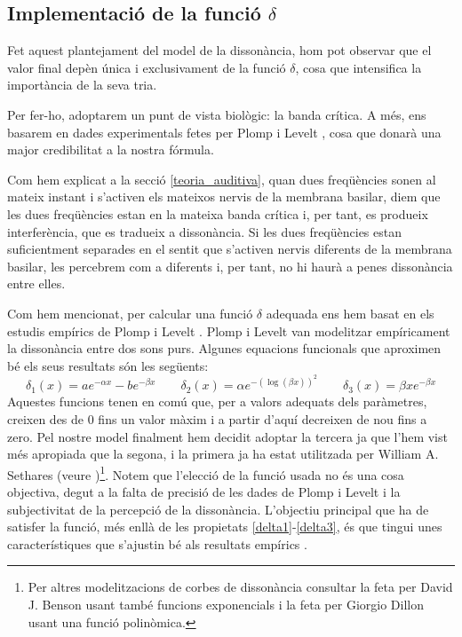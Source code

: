 \documentclass{article}
\theoremstyle{math}
\theoremstyle{TheoremNum}
\newcommand{\0}{\ensuremath{\vb{0}}}
\begin{document}
\subsection{Implementació de la funció \texorpdfstring{$\delta$}{delta}} 
Fet aquest plantejament del model de la dissonància, hom pot observar que el valor final depèn única i exclusivament de la funció $\delta$, cosa que intensifica la importància de la seva tria.\par
Per fer-ho, adoptarem un punt de vista biològic: la banda crítica. A més, ens basarem en dades experimentals fetes per Plomp i Levelt \cite{plomp}, cosa que donarà una major credibilitat a la nostra fórmula.\par Com hem explicat a la secció \ref{teoria_auditiva}, quan dues freqüències sonen al mateix instant i s'activen els mateixos nervis de la membrana basilar, diem que les dues freqüències estan en la mateixa banda crítica i, per tant, es produeix interferència, que es tradueix a dissonància. Si les dues freqüències estan suficientment separades en el sentit que s'activen nervis diferents de la membrana basilar, les percebrem com a diferents i, per tant, no hi haurà a penes dissonància entre elles.\par 
Com hem mencionat, per calcular una funció $\delta$ adequada ens hem basat en els estudis empírics de Plomp i Levelt \cite{plomp}. Plomp i Levelt van modelitzar empíricament la dissonància entre dos sons purs. Algunes equacions funcionals que aproximen bé els seus resultats són les següents: $$\delta_1(x)=ae^{-\alpha x}-be^{-\beta x}\qquad\delta_2(x)=\alpha e^{-\left(\log(\beta x)\right)^2}\qquad\delta_3(x)=\beta xe^{-\beta x}$$
Aquestes funcions tenen en comú que, per a valors adequats dels paràmetres, creixen des de 0 fins un valor màxim i a partir d'aquí decreixen de nou fins a zero. Pel nostre model finalment hem decidit adoptar la tercera ja que l'hem vist més apropiada que la segona, i la primera ja ha estat utilitzada per William A. Sethares (veure \cite{sethares1})\footnote{Per altres modelitzacions de corbes de dissonància consultar la feta per David J. Benson \cite{benson} usant també funcions exponencials i la feta per Giorgio Dillon \cite{dillon} usant una funció polinòmica.}. Notem que l'elecció de la funció usada no és una cosa objectiva, degut a la falta de precisió de les dades de Plomp i Levelt i la subjectivitat de la percepció de la dissonància. L'objectiu principal que ha de satisfer la funció, més enllà de les propietats \ref{delta1}-\ref{delta3}, és que tingui unes característiques que s'ajustin bé als resultats empírics \cite{benson}.\par
\end{document}
